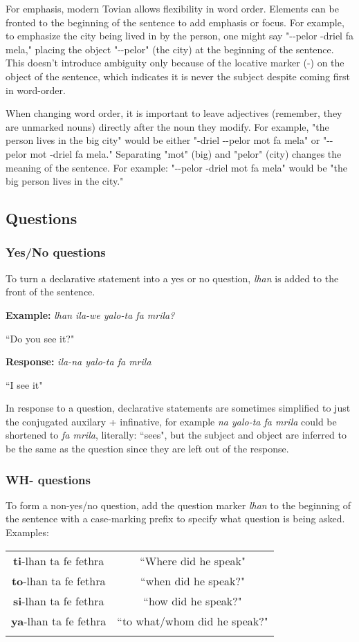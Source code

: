 \documentclass[letterpaper,twocolumn,openany,nodeprecatedcode,hidelinks]{dndbook}
\begin{document}
For emphasis, modern Tovian allows flexibility in word order. Elements can be fronted to the beginning of the sentence to add emphasis or focus. For example, to emphasize the city being lived in by the person, one might say "\CAloc-\CLin-pelor \CLan-driel fa mela," placing the object "\CAloc-\CLin-pelor" (the city) at the beginning of the sentence. This doesn't introduce ambiguity only because of the locative marker (\CAloc-) on the object of the sentence, which indicates it is never the subject despite coming first in word-order.

When changing word order, it is important to leave adjectives (remember, they are unmarked nouns) directly after the noun they modify. For example, "the person lives in the big city" would be either "\CLan-driel \CAloc-\CLin-pelor mot fa mela" or "\CAloc-\CLin-pelor mot \CLan-driel fa mela." Separating "mot" (big) and "pelor" (city) changes the meaning of the sentence. For example: "\CAloc-\CLin-pelor \CLan-driel mot fa mela" would be "the big person lives in the city." 


\subsection*{Questions}
\subsubsection{Yes/No questions}
To turn a declarative statement into a yes or no question, \textit{lhan} is added to the front of the sentence.

\textbf{Example: } \textit{lhan ila-we yalo-ta fa mrila?}

``Do you see it?"

\textbf{Response:} \textit{ila-na yalo-ta fa mrila}

``I see it"

In response to a question, declarative statements are sometimes simplified to just the conjugated auxilary + infinative, for example \textit{na yalo-ta fa mrila} could be shortened to \textit{fa mrila}, literally: ``sees", but the subject and object are inferred to be the same as the question since they are left out of the response. 

\medskip

\subsubsection{WH- questions}
 To form a non-yes/no question, add the question marker \textit{lhan} to the beginning of the sentence with a case-marking prefix to specify what question is being asked. 
 Examples:
     \begin{tabular}{c c}
        \textbf{ti}-lhan ta fe fethra & ``Where did he speak" \\
        \textbf{to}-lhan ta fe fethra & ``when did he speak?" \\
        \textbf{si}-lhan ta fe fethra & ``how did he speak?" \\
        \textbf{ya}-lhan ta fe fethra & ``to what/whom did he speak?" \\
          & 
     \end{tabular}
\end{document}
